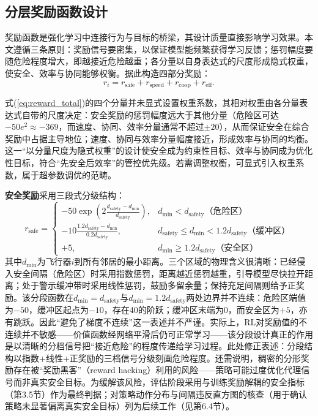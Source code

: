 \documentclass[12pt,a4paper,UTF8]{ctexart}
\begin{document}
\subsection{分层奖励函数设计}

奖励函数是强化学习中连接行为与目标的桥梁，其设计质量直接影响学习效果。本文遵循三条原则：奖励信号要密集，以保证模型能频繁获得学习反馈；惩罚幅度要随危险程度增大，即越接近危险越重；各分量以自身表达式的尺度形成隐式权重，使安全、效率与协同能够权衡。据此构造四部分奖励：
\begin{equation}
    r_i = r_{\text{safe}} + r_{\text{speed}} + r_{\text{coop}} + r_{\text{eff}}.
    \label{eq:reward_total}
\end{equation}

式(\ref{eq:reward_total})的四个分量并未显式设置权重系数，其相对权重由各分量表达式自带的尺度决定：安全奖励的惩罚幅度远大于其他分量（危险区可达$-50e^{2}\approx-369$，而速度、协同、效率分量通常不超过$\pm20$），从而保证安全在综合奖励中占据主导地位；速度、协同与效率分量幅度接近，形成效率与协同的均衡。这一“以分量尺度为隐式权重”的设计使安全成为约束性目标、效率与协同成为优化性目标，符合“先安全后效率”的管控优先级。若需调整权衡，可显式引入权重系数，属于超参数调优的范畴。

\textbf{安全奖励}采用三段式分级结构：
\begin{equation}
    r_{\text{safe}} = \begin{cases}
        -50 \exp\!\left(2\frac{d_{\text{safety}}-d_{\min}}{d_{\text{safety}}}\right), & d_{\min}<d_{\text{safety}} \text{（危险区）}\\
        -10 \frac{1.2d_{\text{safety}}-d_{\min}}{0.2d_{\text{safety}}}, & d_{\text{safety}}\leq d_{\min}<1.2d_{\text{safety}} \text{（缓冲区）}\\
        +5, & d_{\min}\geq1.2d_{\text{safety}} \text{（安全区）}
    \end{cases}
    \label{eq:reward_safe}
\end{equation}
其中$d_{\min}$为飞行器$i$到所有邻居的最小距离。三个区域的物理含义很清晰：已经侵入安全间隔（危险区）时采用指数惩罚，距离越近惩罚越重，引导模型尽快拉开距离；处于警示缓冲带时采用线性惩罚，鼓励多留余量；保持充足间隔则给予正奖励。该分段函数在$d_{\min}=d_{\text{safety}}$与$d_{\min}=1.2d_{\text{safety}}$两处边界并不连续：危险区端值为$-50$，缓冲区起点为$-10$，存在40的阶跃；缓冲区末端为0，而安全区为$+5$，亦有跳跃。因此“避免了梯度不连续”这一表述并不严谨。实际上，RL对奖励值的不连续并不敏感——价值函数经网络平滑后仍可正常学习——该分段设计真正的作用是以清晰的分档信号把“接近危险”的程度传递给学习过程。此处修正表述：分段结构以指数+线性+正奖励的三档信号分级刻画危险程度。还需说明，稠密的分形奖励存在被“奖励黑客”（reward hacking）利用的风险——策略可能过度优化代理信号而非真实安全目标。为缓解该风险，评估阶段采用与训练奖励解耦的安全指标（第3.5节）作为最终判据；对策略动作分布与间隔违反直方图的核查（用于确认策略未显著偏离真实安全目标）列为后续工作（见第6.4节）。
\end{document}
